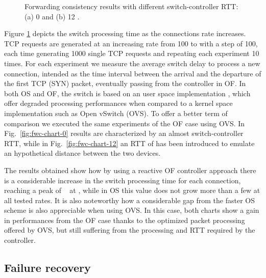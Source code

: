 \documentclass[10pt,conference]{IEEEtran}
\begin{document}
\begin{figure}
{{
     }
     \label{fig:fwc-chart-12}}
  \caption{Forwarding consistency results with different switch-controller RTT: (a) 0   and (b) 12 .}
  \label{fig:fwc-charts}\end{figure} 
Figure \ref{fig:fwc-charts} depicts the switch processing time as the connections rate increases. TCP requests are generated at an increasing rate from 100 to  with a step of 100, each time generating 1000 single TCP requests and repeating each experiment 10 times. For each experiment we measure the average switch delay to process a new connection, intended as the time interval between the arrival and the departure of the first TCP (SYN) packet, eventually passing from the controller in OF. In both OS and OF, the switch is based on an user space implementation \cite{ofsoftswitch13}, which offer degraded processing performances when compared to a kernel space implementation such as Open vSwitch (OVS). To offer a better term of comparison we executed the same experiments of the OF case using OVS. In Fig.~\ref{fig:fwc-chart-0} results are characterized by an almost  switch-controller RTT, while in Fig.~\ref{fig:fwc-chart-12} an RTT of  has been introduced to emulate an hypothetical distance between the two devices.

The results obtained show how by using a reactive OF controller approach there is a considerable increase in the switch processing time for each connection, reaching a peak of ~ at , while in OS this value does not grow more than a few  at all tested rates. It is also noteworthy how a considerable gap from the faster OS scheme is also appreciable when using OVS. In this case, both charts show a gain in performances from the OF case thanks to the optimized packet processing offered by OVS, but still suffering from the processing and RTT required by the controller. 

\subsection{Failure recovery}
\end{document}
